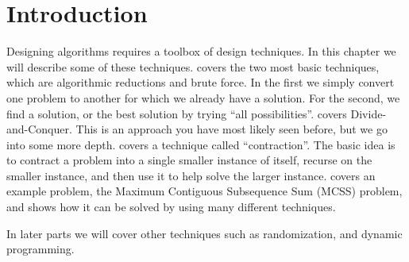 \chapter{Introduction}
\label{ch:design::intro}

\begin{cluster}
\label{grp:grm:design::intro::designing}

\begin{gram}
\label{grm:design::intro::designing}
  Designing algorithms requires a toolbox of design techniques.   In
  this chapter we will describe some of these techniques.  
    covers the two most basic techniques,
  which are algorithmic reductions and brute force.   In the first we
  simply convert one problem to another for which we already
  have a solution.   For the second, we find a solution, or the best
  solution by trying ``all possibilities''.    
  covers Divide-and-Conquer.     This is an approach you have most
  likely seen before, but we go into some more depth.
   covers a technique called
  ``contraction''.   The basic idea is to contract a problem into a
  single smaller instance of itself, recurse on the smaller instance,
  and then use it to help solve the larger instance.
   covers an example problem, the Maximum Contiguous
  Subsequence Sum (MCSS) problem, and shows how it can be solved by
  using many different techniques.
  
  In later parts we will cover other techniques such as randomization,
  and dynamic programming.

\end{gram}
\end{cluster}

